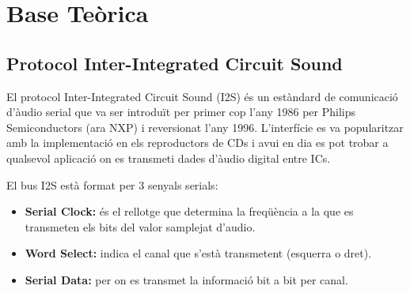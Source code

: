 \chapter{Base Teòrica}
\section{Protocol Inter-Integrated Circuit Sound}
\par El protocol Inter-Integrated Circuit Sound (I2S) és un estàndard de comunicació d'àudio serial que va ser introduït per primer cop l'any 1986 per Philips Semiconductors (ara NXP) i reversionat l'any 1996. L'interfície es va popularitzar amb la implementació en els reproductors de CDs i avui en dia es pot trobar a qualsevol aplicació on es transmeti dades d'àudio digital entre ICs. \cite{I2S_manual}
\par El bus I2S està format per 3 senyals serials:
\begin{itemize}
    \item \textbf{Serial Clock:} és el rellotge que determina la freqüència a la que es transmeten els bits del valor samplejat d'audio.
    \item \textbf{Word Select:} indica el canal que s'està transmetent (esquerra o dret).
    \item \textbf{Serial Data:} per on es transmet la informació bit a bit per canal. 
\end{itemize}
 
